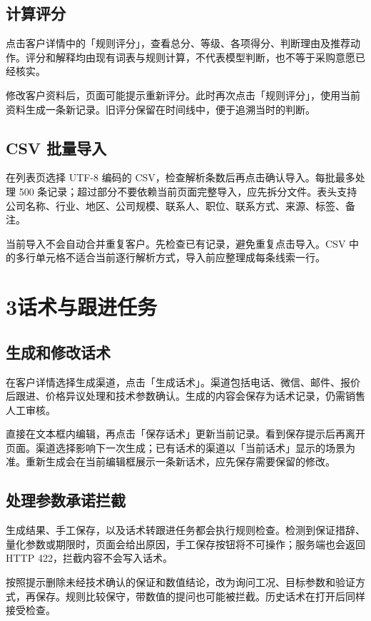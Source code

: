 \documentclass[UTF8,fontset=fandol,zihao=5,a4paper]{ctexart}
\begin{document}
\subsection*{计算评分}
点击客户详情中的「规则评分」，查看总分、等级、各项得分、判断理由及推荐动作。评分和解释均由现有词表与规则计算，不代表模型判断，也不等于采购意愿已经核实。

修改客户资料后，页面可能提示重新评分。此时再次点击「规则评分」，使用当前资料生成一条新记录。旧评分保留在时间线中，便于追溯当时的判断。

\subsection*{CSV 批量导入}
在列表页选择 UTF-8 编码的 CSV，检查解析条数后再点击确认导入。每批最多处理 500 条记录；超过部分不要依赖当前页面完整导入，应先拆分文件。表头支持公司名称、行业、地区、公司规模、联系人、职位、联系方式、来源、标签、备注。

当前导入不会自动合并重复客户。先检查已有记录，避免重复点击导入。CSV 中的多行单元格不适合当前逐行解析方式，导入前应整理成每条线索一行。

\newpage
\section*{3\quad 话术与跟进任务}
\subsection*{生成和修改话术}
在客户详情选择生成渠道，点击「生成话术」。渠道包括电话、微信、邮件、报价后跟进、价格异议处理和技术参数确认。生成的内容会保存为话术记录，仍需销售人工审核。

直接在文本框内编辑，再点击「保存话术」更新当前记录。看到保存提示后再离开页面。渠道选择影响下一次生成；已有话术的渠道以「当前话术」显示的场景为准。重新生成会在当前编辑框展示一条新话术，应先保存需要保留的修改。

\subsection*{处理参数承诺拦截}
生成结果、手工保存，以及话术转跟进任务都会执行规则检查。检测到保证措辞、量化参数或期限时，页面会给出原因，手工保存按钮将不可操作；服务端也会返回 HTTP 422，拦截内容不会写入话术。

按照提示删除未经技术确认的保证和数值结论，改为询问工况、目标参数和验证方式，再保存。规则比较保守，带数值的提问也可能被拦截。历史话术在打开后同样接受检查。
\end{document}
